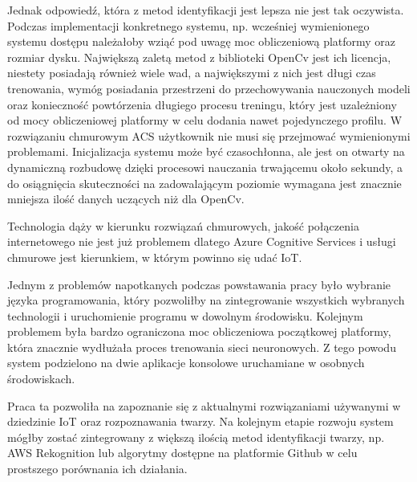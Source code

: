 Jednak odpowiedź, która z metod identyfikacji jest lepsza nie jest tak oczywista. Podczas implementacji konkretnego systemu, np. wcześniej wymienionego systemu dostępu należałoby wziąć pod uwagę moc obliczeniową platformy oraz rozmiar dysku. Największą zaletą metod z biblioteki OpenCv jest ich licencja, niestety posiadają również wiele wad, a największymi z nich jest długi czas trenowania, wymóg posiadania przestrzeni do przechowywania nauczonych modeli oraz konieczność powtórzenia długiego procesu treningu, który jest uzależniony od mocy obliczeniowej platformy w celu dodania nawet pojedynczego profilu. W rozwiązaniu chmurowym ACS użytkownik nie musi się przejmować wymienionymi problemami. Inicjalizacja systemu może być czasochłonna, ale jest on otwarty na dynamiczną rozbudowę dzięki procesowi nauczania trwającemu około sekundy, a do osiągnięcia skuteczności na zadowalającym poziomie wymagana jest znacznie mniejsza ilość danych uczących niż dla OpenCv. 

Technologia dąży w kierunku rozwiązań chmurowych, jakość połączenia internetowego nie jest już problemem dlatego Azure Cognitive Services i usługi chmurowe jest kierunkiem, w którym powinno się udać IoT.

Jednym z problemów napotkanych podczas powstawania pracy było wybranie języka programowania, który pozwoliłby na zintegrowanie wszystkich wybranych technologii i uruchomienie programu w dowolnym środowisku. Kolejnym problemem była bardzo ograniczona moc obliczeniowa początkowej platformy, która znacznie wydłużała proces trenowania sieci neuronowych. Z tego powodu system podzielono na dwie aplikacje konsolowe uruchamiane w osobnych środowiskach.

Praca ta pozwoliła na zapoznanie się  z aktualnymi rozwiązaniami używanymi w dziedzinie IoT oraz rozpoznawania twarzy. Na kolejnym etapie rozwoju system mógłby zostać zintegrowany z większą ilością metod identyfikacji twarzy, np. AWS Rekognition lub algorytmy dostępne na platformie Github w celu prostszego porównania ich działania.


